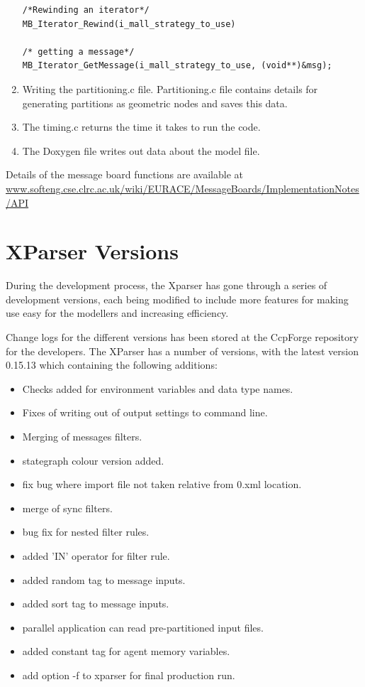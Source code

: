 \begin{enumerate}
\begin{mylisting}
\begin{verbatim}
/*Rewinding an iterator*/
MB_Iterator_Rewind(i_mall_strategy_to_use)

/* getting a message*/
MB_Iterator_GetMessage(i_mall_strategy_to_use, (void**)&msg);
\end{verbatim}
\end{mylisting}

\item Writing the partitioning.c file. Partitioning.c file contains details for generating partitions as geometric nodes and saves this data.
\item The timing.c returns the time it takes to run the code.
\item The Doxygen file writes out data about the model file.

\end{enumerate}

Details of the message board functions are available at \url{www.softeng.cse.clrc.ac.uk/wiki/EURACE/MessageBoards/ImplementationNotes/API}

\section{XParser Versions}

During the development process, the Xparser has gone through a series of development versions, each being modified to include more features for making use easy for the modellers and increasing efficiency.

Change logs for the different versions has been stored at the CcpForge repository for the developers. The XParser has a number of versions, with the latest version 0.15.13 which containing the following additions:
\begin{itemize}
\item Checks added for environment variables and data type names.
\item Fixes of writing out of output settings to command line.
\item Merging of messages filters.
\item    stategraph colour version added.
\item    fix bug where import file not taken relative from 0.xml location.
\item    merge of sync filters.
\item    bug fix for nested filter rules.
\item added 'IN' operator for filter rule.
\item added random tag to message inputs.
\item added sort tag to message inputs.
\item parallel application can read pre-partitioned input files.
\item added constant tag for agent memory variables.
\item add option -f to xparser for final production run.
\end{itemize}

